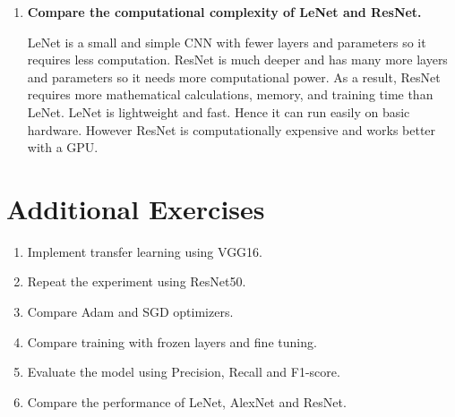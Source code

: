\documentclass[11pt]{article}
\begin{document}
\begin{enumerate}[leftmargin=*]
    \item \textbf{Compare the computational complexity of LeNet and ResNet.}
    
    \vspace{5mm}
    
    LeNet is a small and simple CNN with fewer layers and parameters so it requires less computation.
    ResNet is much deeper and has many more layers and parameters so it needs more computational power.
    As a result, ResNet requires more mathematical calculations, memory, and training time than LeNet.
    LeNet is lightweight and fast. Hence it can run easily on basic hardware. 
    However ResNet is computationally expensive and works better with a GPU.    
    \vspace{3mm}
    
\end{enumerate}

\clearpage
\section{Additional Exercises}
\begin{enumerate}[leftmargin=*]
    \item Implement transfer learning using VGG16.
    \item Repeat the experiment using ResNet50.
    \item Compare Adam and SGD optimizers.
    \item Compare training with frozen layers and fine tuning.
    \item Evaluate the model using Precision, Recall and F1-score.
    \item Compare the performance of LeNet, AlexNet and ResNet.
\end{enumerate}
\end{document}
